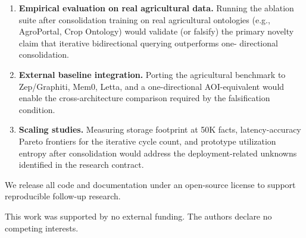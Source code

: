 \documentclass{article}
\begin{document}
\begin{enumerate}
  \item \textbf{Empirical evaluation on real agricultural data.} Running the
        ablation suite after consolidation training on real agricultural ontologies
        (e.g., AgroPortal, Crop Ontology) would validate (or falsify) the primary
        novelty claim that iterative bidirectional querying outperforms one-
        directional consolidation.
  \item \textbf{External baseline integration.} Porting the agricultural benchmark
        to Zep/Graphiti, Mem0, Letta, and a one-directional AOI-equivalent would
        enable the cross-architecture comparison required by the falsification
        condition.
  \item \textbf{Scaling studies.} Measuring storage footprint at 50K facts,
        latency-accuracy Pareto frontiers for the iterative cycle count, and
        prototype utilization entropy after consolidation would address the
        deployment-related unknowns identified in the research contract.
\end{enumerate}

We release all code and documentation under an open-source license to support
reproducible follow-up research.

\begin{ack}
This work was supported by no external funding. The authors declare no competing
interests.
\end{ack}
\end{document}
